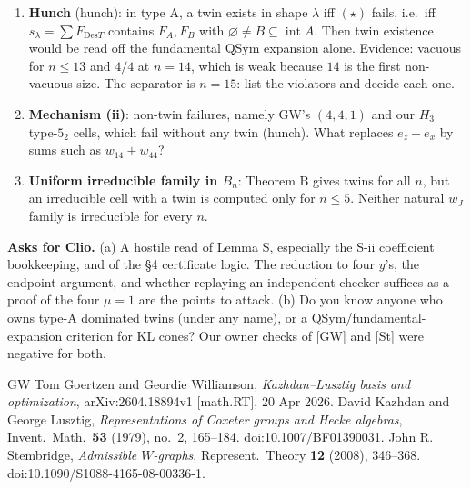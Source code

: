 \documentclass[11pt]{amsart}
\newcommand{\gr}[1]{\textsf{#1}}
\theoremstyle{definition}
\theoremstyle{remark}
\newcommand{\Des}{\mathrm{Des}}
\newcommand{\intr}{\operatorname{int}}
\begin{document}
\begin{enumerate}[leftmargin=*,itemsep=2pt]
\item \textbf{Hunch} (\gr{hunch}): in type A, a twin exists in shape $\lambda$ iff $(\star)$ fails, i.e.\ iff $s_\lambda=\sum F_{\Des T}$ contains $F_A,F_B$ with $\varnothing\ne B\subseteq\intr A$. Then twin existence would be read off the fundamental QSym expansion alone. Evidence: vacuous for $n\le13$ and $4/4$ at $n=14$, which is weak because $14$ is the first non-vacuous size. The separator is $n=15$: list the violators and decide each one.
\item \textbf{Mechanism (ii)}: non-twin failures, namely GW's $(4,4,1)$ and our $H_3$ type-$5_2$ cells, which fail without any twin (\gr{hunch}). What replaces $e_z-e_x$ by sums such as $w_{14}+w_{44}$?
\item \textbf{Uniform irreducible family in $B_n$}: Theorem B gives twins for all $n$, but an irreducible cell with a twin is \gr{computed} only for $n\le5$. Neither natural $w_J$ family is irreducible for every $n$.
\end{enumerate}

\textbf{Asks for Clio.}
(a) A hostile read of Lemma S, especially the S-ii coefficient bookkeeping, and of the \S4 certificate logic. The reduction to four $y$'s, the endpoint argument, and whether replaying an independent checker suffices as a proof of the four $\mu=1$ are the points to attack.
(b) Do you know anyone who owns type-A dominated twins (under any name), or a QSym/fundamental-expansion criterion for KL cones? Our owner checks of [GW] and [St] were negative for both.

\begin{thebibliography}{GW}
 Tom Goertzen and Geordie Williamson, \emph{Kazhdan--Lusztig basis and optimization}, arXiv:2604.18894v1 [math.RT], 20 Apr 2026.
 David Kazhdan and George Lusztig, \emph{Representations of Coxeter groups and Hecke algebras}, Invent.\ Math.\ \textbf{53} (1979), no.~2, 165--184. doi:10.1007/BF01390031.
 John R. Stembridge, \emph{Admissible $W$-graphs}, Represent.\ Theory \textbf{12} (2008), 346--368. doi:10.1090/S1088-4165-08-00336-1.
\end{thebibliography}
\end{document}
